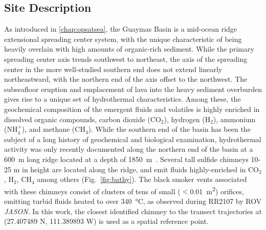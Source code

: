\subsection{Site Description}
As introduced in \cref{chap:opsatsea}, the Guaymas Basin is a mid-ocean ridge extensional spreading center system, with the unique characteristic of being heavily overlain with high amounts of organic-rich sediment. While the primary spreading center axis trends southwest to northeast, the axis of the spreading center in the more well-studied southern end does not extend linearly northeastward, with the northern end of the axis offset to the northwest. The subseafloor eruption and emplacement of lava into the heavy sediment overburden gives rise to a unique set of hydrothermal characteristics. Among these, the geochemical composition of the emergent fluids and volatiles is highly enriched in dissolved organic compounds, carbon dioxide (CO$_2$), hydrogen (H$_2$), ammonium (NH$_{4}^{+}$), and methane (CH$_4$)\autocite{seewald1994variations, von1985chemistry}. While the southern end of the basin has been the subject of a long history of geochemical and biological examination\autocite{ondreas2018recent, teske2016guaymas, seewald1994variations, von1985chemistry, lonsdale1985hydrothermal}, hydrothermal activity was only recently documented along the northern end of the basin at a \SI{600}{\meter} long ridge located at a depth of \SI{1850}{\meter}~\autocite{soule2018exploration, geilert2018formation}. Several tall sulfide chimneys 10-25 m in height are located along the ridge, and emit fluids highly-enriched in CO$_2$, H$_2$, CH$_4$ among others (Fig.~\ref{fig:bathy}). The black smoker vents associated with these chimneys consist of clusters of tens of small ($<$\SI{0.01}{\meter\squared}) orifices, emitting turbid fluids heated to over \SI{340}{\celsius}, as observed during RR2107 by ROV \emph{JASON}. In this work, the closest identified chimney to the transect trajectories at (27.407489 N, 111.389893 W) is used as a spatial reference point.

